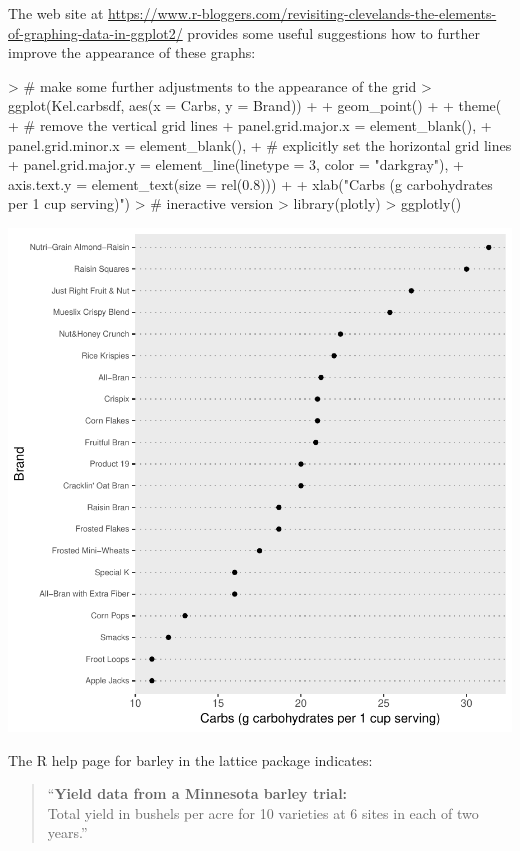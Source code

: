 \documentclass[12pt,letterpaper,final]{article}
\begin{document}
The web site at \url{https://www.r-bloggers.com/revisiting-clevelands-the-elements-of-graphing-data-in-ggplot2/}
provides some useful suggestions how to further improve the appearance of these graphs:

\begin{Schunk}
\begin{Sinput}
> # make some further adjustments to the appearance of the grid
> ggplot(Kel.carbsdf, aes(x = Carbs, y = Brand)) +
+   geom_point() +
+   theme( 
+     # remove the vertical grid lines
+     panel.grid.major.x = element_blank(),
+     panel.grid.minor.x = element_blank(),
+     # explicitly set the horizontal grid lines
+     panel.grid.major.y = element_line(linetype = 3, color = "darkgray"),
+     axis.text.y = element_text(size = rel(0.8))) +
+   xlab("Carbs (g carbohydrates per 1 cup serving)")
> # ineractive version
> library(plotly)
> ggplotly()
\end{Sinput}
\end{Schunk}
\includegraphics{lect_main-024}


\newpage


The R help page for barley in the lattice package indicates:
\begin{quotation}
\noindent
``{\bf Yield data from a Minnesota barley trial:} \\[0.2cm]
%
Total yield in bushels per acre for 10 varieties at 6 sites in each of two years.''
\end{quotation}
\end{document}
